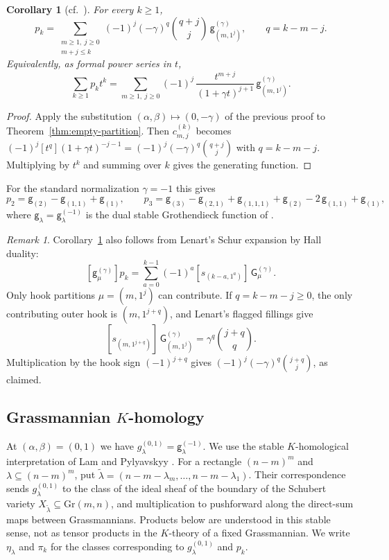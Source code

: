 \documentclass[11pt]{amsart}
\DeclareRobustCommand{\S}{\ensuremath{\mathsection}}
\numberwithin{equation}{section}
\newtheorem{corollary}[theorem]{Corollary}
\theoremstyle{definition}
\theoremstyle{remark}
\newtheorem{remark}[theorem]{Remark}
\newcommand{\sG}{\mathsf G}
\newcommand{\sg}{\mathsf g}
\begin{document}
\begin{corollary}[cf.\ \cite{Lenart}]\label{cor:one-param-pk}
For every $k\geq1$,
\[
 p_k=\sum_{\substack{m\geq1,\ j\geq0\\ m+j\leq k}}
 (-1)^j(-\gamma)^{q}\binom{q+j}{j}\,\sg^{(\gamma)}_{(m,1^j)},
 \qquad q=k-m-j .
\]
Equivalently, as formal power series in $t$,
\[
 \sum_{k\geq1}p_kt^k=\sum_{m\geq1,\ j\geq0}(-1)^j\,
 \frac{t^{m+j}}{(1+\gamma t)^{j+1}}\,\sg^{(\gamma)}_{(m,1^j)} .
\]
\end{corollary}

\begin{proof}
Apply the substitution $(\alpha,\beta)\mapsto(0,-\gamma)$ of the previous
proof to Theorem~\ref{thm:empty-partition}. Then
$c^{(k)}_{m,j}$ becomes $(-1)^j[t^q](1+\gamma t)^{-j-1}=(-1)^j(-\gamma)^q\binom{q+j}{j}$
with $q=k-m-j$. Multiplying by $t^k$ and summing over $k$ gives the
generating function.
\end{proof}

For the standard normalization $\gamma=-1$ this gives
\[
 p_2=\sg_{(2)}-\sg_{(1,1)}+\sg_{(1)},\qquad
 p_3=\sg_{(3)}-\sg_{(2,1)}+\sg_{(1,1,1)}+\sg_{(2)}-2\,\sg_{(1,1)}+\sg_{(1)},
\]
where $\sg_\lambda=\sg^{(-1)}_\lambda$ is the dual stable Grothendieck function of
\cite{LamPylyavskyy}.

\begin{remark}
Corollary~\ref{cor:one-param-pk} also follows from Lenart's
Schur expansion \cite[Thm.~2.2]{Lenart} by Hall duality:
\[
 [\sg^{(\gamma)}_\mu]p_k
 =\sum_{a=0}^{k-1}(-1)^a
   [s_{(k-a,1^a)}]\,\sG^{(\gamma)}_\mu.
\]
Only hook partitions $\mu=(m,1^j)$ can contribute. If
$q=k-m-j\geq0$, the only contributing outer hook is
$(m,1^{j+q})$, and Lenart's flagged fillings give
\[
 [s_{(m,1^{j+q})}]\,\sG^{(\gamma)}_{(m,1^j)}
 =\gamma^q\binom{j+q}{q}.
\]
Multiplication by the hook sign $(-1)^{j+q}$ gives
$(-1)^j(-\gamma)^q\binom{j+q}{j}$, as claimed.
\end{remark}



\subsection{Grassmannian \texorpdfstring{$K$}{K}-homology}\label{subsec:K-homology}
At $(\alpha,\beta)=(0,1)$ we have $g^{(0,1)}_\lambda=\sg^{(-1)}_\lambda$. We use
the stable $K$-homological interpretation of Lam and Pylyavskyy
\cite[\S9.5, Thm.~9.16]{LamPylyavskyy}. For a rectangle $(n-m)^m$ and
$\lambda\subseteq(n-m)^m$, put
$\widetilde\lambda=(n-m-\lambda_m,\dots,n-m-\lambda_1)$. Their correspondence
sends $g^{(0,1)}_\lambda$ to the class of the ideal sheaf of the boundary of
the Schubert variety $X_{\widetilde\lambda}\subseteq\mathrm{Gr}(m,n)$, and
multiplication to pushforward along the direct-sum maps between
Grassmannians. Products below are understood in this stable sense, not as
tensor products in the $K$-theory of a fixed Grassmannian. We write
$\eta_\lambda$ and $\pi_k$ for the classes corresponding to
$g^{(0,1)}_\lambda$ and $p_k$.
\end{document}
